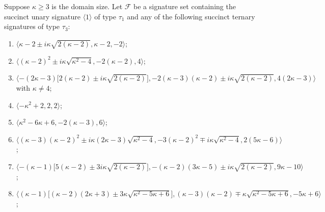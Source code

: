 \documentclass[11pt]{article}
\begin{document}
\begin{lemma} \label{lem:appendix:binary}
 Suppose $\kappa \ge 3$ is the domain size.
 Let $\mathcal{F}$ be a signature set containing the succinct unary signature $\langle 1 \rangle$ of type $\tau_1$
 and any of the following succinct ternary signatures of type $\tau_3$:
 \begin{enumerate}
  \item $\langle \kappa - 2 \pm i \kappa \sqrt{2 (\kappa - 2)}, \kappa - 2, -2 \rangle$;%
  \label{case:lem:appendix:k-2pmik2k-2k-2-2}
  
  \item $\langle (\kappa - 2)^2 \pm i \kappa \sqrt{\kappa^2 - 4}, -2 (\kappa - 2), 4 \rangle$;%
  \label{case:lem:appendix:k-22pmikk2-2-2k-24}
  
  \item $\langle -(2 \kappa - 3) \big[2 (\kappa - 2) \pm i \kappa \sqrt{2 (\kappa - 2)}\big], -2 (\kappa - 3) (\kappa - 2) \pm i \kappa \sqrt{2 (\kappa - 2)}, 4 (2 \kappa - 3) \rangle$
  with $\kappa \ne 4$;%
  \label{case:lem:appendix:-2k-32k-2pmik2k-2-2k-3k-2pmik2k-242k-3}
  
  \item $\langle -\kappa^2 + 2, 2, 2 \rangle$;%
  \label{case:lem:appendix:-k2+222}
  
  \item $\langle \kappa^2 - 6 \kappa + 6, -2 (\kappa - 3), 6 \rangle$;%
  \label{case:lem:appendix:k2-6k+6-2k-36}
  
  \item $\langle (\kappa - 3) (\kappa - 2)^2 \pm i \kappa (2 \kappa - 3) \sqrt{\kappa^2 - 4}, -3 (\kappa - 2)^2 \mp i \kappa \sqrt{\kappa^2 - 4}, 2 (5 \kappa - 6) \rangle$;%
  \label{case:lem:appendix:k-3k-22pmik2k-3-k2-4-3k-22mpikk2-425k-6}
  
  \item $\langle -(\kappa - 1) \big[5 (\kappa - 2) \pm 3 i \kappa \sqrt{2 (\kappa - 2)}\big], -(\kappa - 2) (3 \kappa - 5) \pm i \kappa \sqrt{2 (\kappa - 2)}, 9 \kappa - 10 \rangle$;%
  \label{case:lem:appendix:-k-15k-2mp3ik2k-2-k-23k-5mpik3k-29k-10}
  
  \item $\langle (\kappa - 1) \big[(\kappa - 2) (2 \kappa + 3) \pm 3 \kappa \sqrt{\kappa^2 - 5 \kappa + 6}\big], (\kappa - 3) (\kappa - 2) \mp \kappa \sqrt{\kappa^2 - 5 \kappa + 6}, -5 \kappa + 6 \rangle$;%
  \label{case:lem:appendix:k-1k-22k+3mp3kk2-5k+6k-3k-2pmkk2-5k+6-5k+6}
  

\end{enumerate}
\end{lemma}
\end{document}
